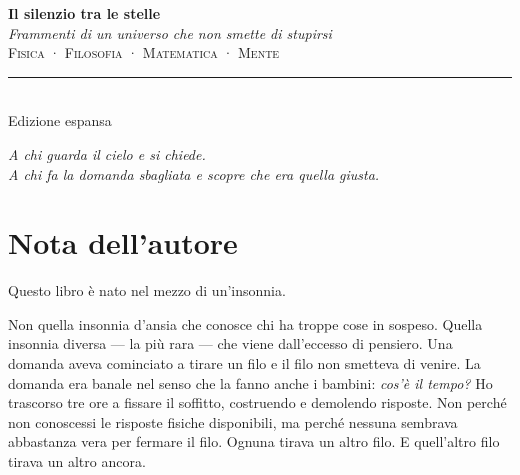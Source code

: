 \documentclass[12pt,a4paper,openany]{book}
\begin{document}
\begin{titlepage}
\begin{center}
\vspace*{3cm}
{\fontsize{36}{44}\selectfont\bfseries Il silenzio tra le stelle}\\[1.2em]
{\fontsize{14}{18}\selectfont\itshape Frammenti di un universo che non smette di stupirsi}\\[3em]
{\large\scshape Fisica · Filosofia · Matematica · Mente}\\[5em]
\rule{0.4\textwidth}{0.5pt}\\[2em]
{\normalsize Edizione espansa}
\vfill
\end{center}
\end{titlepage}

\thispagestyle{empty}
\vspace*{8cm}
\begin{center}
\itshape
A chi guarda il cielo e si chiede.\\
A chi fa la domanda sbagliata e scopre che era quella giusta.\\[2em]
\end{center}
\clearpage

\chapter*{Nota dell'autore}

Questo libro è nato nel mezzo di un'insonnia.

Non quella insonnia d'ansia che conosce chi ha troppe cose in sospeso. Quella insonnia diversa — la più rara — che viene dall'eccesso di pensiero. Una domanda aveva cominciato a tirare un filo e il filo non smetteva di venire. La domanda era banale nel senso che la fanno anche i bambini: \textit{cos'è il tempo?} Ho trascorso tre ore a fissare il soffitto, costruendo e demolendo risposte. Non perché non conoscessi le risposte fisiche disponibili, ma perché nessuna sembrava abbastanza vera per fermare il filo. Ognuna tirava un altro filo. E quell'altro filo tirava un altro ancora.
\end{document}
